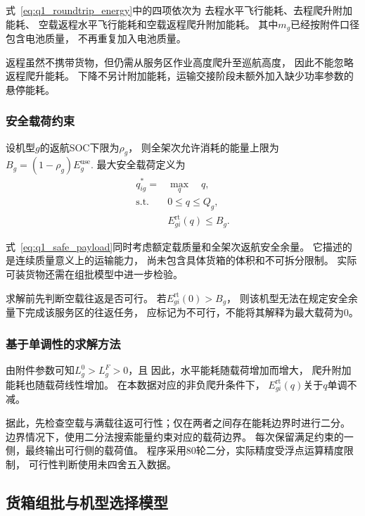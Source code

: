 \documentclass[bwprint]{gmcmthesis}
\begin{document}
式~\eqref{eq:q1_roundtrip_energy}中的四项依次为
去程水平飞行能耗、去程爬升附加能耗、
空载返程水平飞行能耗和空载返程爬升附加能耗。
其中$m_g$已经按附件口径包含电池质量，
不再重复加入电池质量。

返程虽然不携带货物，但仍需从服务区作业高度爬升至巡航高度，
因此不能忽略返程爬升能耗。
下降不另计附加能耗，运输交接阶段未额外加入缺少功率参数的悬停能耗。

\subsubsection{安全载荷约束}

设机型$g$的返航SOC下限为$\rho_g$，
则全架次允许消耗的能量上限为
\(B_g=(1-\rho_g)E_g^{\mathrm{use}}\).
最大安全载荷定义为
\begin{equation}
\begin{aligned}
    q_{ig}^{*}
    ={}&\max_q \quad q,\\
    \text{s.t.}\quad
    &0\leq q\leq Q_g,\\
    &E_{gi}^{\mathrm{rt}}(q)\leq B_g.
\end{aligned}
\label{eq:q1_safe_payload}
\end{equation}

式~\eqref{eq:q1_safe_payload}同时考虑额定载质量和全架次返航安全余量。
它描述的是连续质量意义上的运输能力，
尚未包含具体货箱的体积和不可拆分限制。
实际可装货物还需在组批模型中进一步检验。

求解前先判断空载往返是否可行。
若$E_{gi}^{\mathrm{rt}}(0)>B_g$，
则该机型无法在规定安全余量下完成该服务区的往返任务，
应标记为不可行，不能将其解释为最大载荷为0。

\subsubsection{基于单调性的求解方法}

由附件参数可知$L_g^0>L_g^F>0$，且
因此，水平能耗随载荷增加而增大，
爬升附加能耗也随载荷线性增加。
在本数据对应的非负爬升条件下，
$E_{gi}^{\mathrm{rt}}(q)$关于$q$单调不减。

据此，先检查空载与满载往返可行性；仅在两者之间存在能耗边界时进行二分。
边界情况下，使用二分法搜索能量约束对应的载荷边界。
每次保留满足约束的一侧，最终输出可行侧的载荷值。
程序采用80轮二分，实际精度受浮点运算精度限制，
可行性判断使用未四舍五入数据。

\subsection{货箱组批与机型选择模型}
\end{document}
